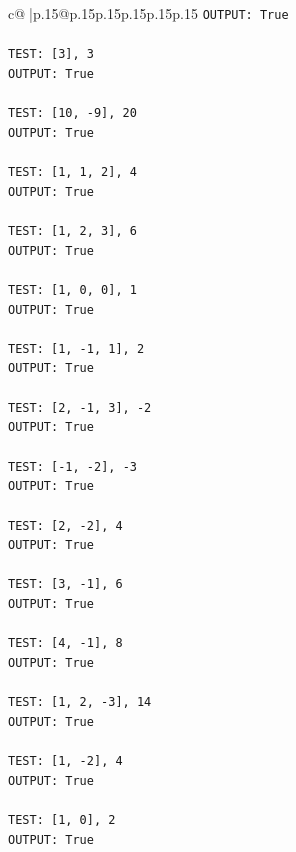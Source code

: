 \documentclass{article}
\begin{document}
{\begin{supertabular}{c@{$\;$}|p{.15\linewidth}@{}p{.15\linewidth}p{.15\linewidth}p{.15\linewidth}p{.15\linewidth}p{.15\linewidth}}
{{{\texttt{OUTPUT: True} \\
\\ 
\texttt{TEST: {[}3{]}, 3} \\
\texttt{OUTPUT: True} \\
\\ 
\texttt{TEST: {[}10, {-}9{]}, 20} \\
\texttt{OUTPUT: True} \\
\\ 
\texttt{TEST: {[}1, 1, 2{]}, 4} \\
\texttt{OUTPUT: True} \\
\\ 
\texttt{TEST: {[}1, 2, 3{]}, 6} \\
\texttt{OUTPUT: True} \\
\\ 
\texttt{TEST: {[}1, 0, 0{]}, 1} \\
\texttt{OUTPUT: True} \\
\\ 
\texttt{TEST: {[}1, {-}1, 1{]}, 2} \\
\texttt{OUTPUT: True} \\
\\ 
\texttt{TEST: {[}2, {-}1, 3{]}, {-}2} \\
\texttt{OUTPUT: True} \\
\\ 
\texttt{TEST: {[}{-}1, {-}2{]}, {-}3} \\
\texttt{OUTPUT: True} \\
\\ 
\texttt{TEST: {[}2, {-}2{]}, 4} \\
\texttt{OUTPUT: True} \\
\\ 
\texttt{TEST: {[}3, {-}1{]}, 6} \\
\texttt{OUTPUT: True} \\
\\ 
\texttt{TEST: {[}4, {-}1{]}, 8} \\
\texttt{OUTPUT: True} \\
\\ 
\texttt{TEST: {[}1, 2, {-}3{]}, 14} \\
\texttt{OUTPUT: True} \\
\\ 
\texttt{TEST: {[}1, {-}2{]}, 4} \\
\texttt{OUTPUT: True} \\
\\ 
\texttt{TEST: {[}1, 0{]}, 2} \\
\texttt{OUTPUT: True} \\
}}}
\end{supertabular}}
\end{document}
